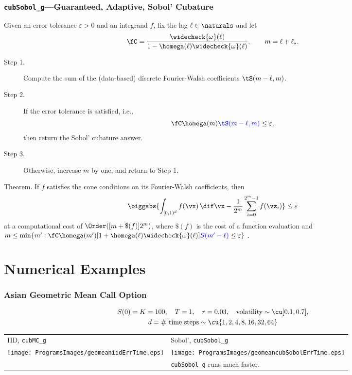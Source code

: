 \documentclass[10pt,compress]{beamer} %
\newcommand{\cube}{[0,1)^d}
\newcommand{\wcomega}{\widecheck{\omega}}
\begin{document}
\begin{frame}[label=algothm]\frametitle{\texttt{cubSobol\_g}---Guaranteed, Adaptive, Sobol' Cubature}
\vspace{-2ex}
Given an \alert{error tolerance} $\varepsilon>0$ and an integrand $f$, fix the lag $\ell \in \naturals$ and let
\[
\fC=\frac{\wcomega(\ell)}{1 - \homega(\ell) \wcomega(\ell)}, \qquad m=\ell+\ell_*.
\]
\vspace{-4ex}
\begin{description}
\item[Step 1.]  Compute the sum of the (data-based) {\color{blue}discrete Fourier-Walsh coefficients $\tS(m-\ell,m)$}.  
\item[Step 2.] If the \alert{error tolerance} is satisfied, i.e.,
\[
\fC \homega(m) {\color{blue}\tS(m-\ell,m)} \le \varepsilon,
\]
then return the Sobol' cubature answer.

\item[Step 3.]  Otherwise, increase $m$ by one, and return to Step 1.

\end{description}

\alert{Theorem.} If $f$ satisfies the \alert{cone} conditions on its Fourier-Walsh coefficients, then 
\[
\biggabs{\int_{\cube} f(\vx) \, \dif \vx - \frac{1}{2^m} \sum_{i=0}^{2^m-1} f(\vz_i)} \le \varepsilon 
\]
at a computational cost of $\Order([m + \$(f)]2^m )$, where $\$(f)$ is the cost of a function evaluation and $m \le \min \{m' : \fC \homega(m') [1+ \homega(\ell) \wcomega(\ell)] {\color{blue}S(m'-\ell)} \le \varepsilon \}$ .

\end{frame}

\section{Numerical Examples}
\begin{frame}\frametitle{Asian Geometric Mean Call Option}
\begin{gather*}
S(0)=K=100, \quad T=1, \quad r=0.03, \quad \text{volatility} \sim \cu[0.1,0.7],\\
 d = \text{\# time steps} \sim \cu \{1,2,4,8,16,32,64\}
\end{gather*}
\begin{tabular}{>{\centering}m{5.7cm}>{\centering}m{5.7cm}}
IID, \texttt{cubMC\_g} & Sobol', \texttt{cubSobol\_g} \tabularnewline
\texttt{[image: ProgramsImages/geomeaniidErrTime.eps]} & 
\texttt{[image: ProgramsImages/geomeancubSobolErrTime.eps]} \tabularnewline
& \texttt{cubSobol\_g} runs much \alert{faster}.
\end{tabular}
\end{frame}
\end{document}
